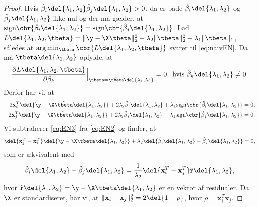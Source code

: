 %
\begin{proof}
Hvis \(\hat{\beta}_i \del{\lambda_1, \lambda_2} \hat{\beta}_j \del{\lambda_1, \lambda_2} > 0\), da er både \(\hat{\beta}_i \del{\lambda_1, \lambda_2}\) og \(\hat{\beta}_j \del{\lambda_1, \lambda_2}\) ikke-nul og der må gælder, at \(\text{sign} \cbr{\hat{\beta}_i \del{\lambda_1, \lambda_2}} = \text{sign} \cbr{\hat{\beta}_j \del{\lambda_1, \lambda_2}}\).
Lad \(L \del{\lambda_1,\lambda_2, \tbeta} = \Vert \y - \X \tbeta \Vert_2^2 + \lambda_2 \Vert \tbeta \Vert_2^2 + \lambda_1 \Vert \tbeta \Vert_1\), således at \(\arg \min_{\tbeta} \cbr{L \del{\lambda_1,\lambda_2, \tbeta}}\) svarer til \eqref{eq:naivEN}.
Da må \(\hat{\tbeta} \del{\lambda_1, \lambda_2}\) opfylde, at
\begin{align*}
\frac{\partial L \del{\lambda_1,\lambda_2, \tbeta} }{\partial \beta_k} \Bigr|_{\tbeta = \hat{\tbeta} \del{\lambda_1, \lambda_2}}=0, \text{ hvis } \hat{\beta}_k \del{\lambda_1, \lambda_2} \neq 0.
\end{align*}
Derfor har vi, at
\begin{align}
-2 \mathbf{x}_i^T \del{\y - \X \hat{\tbeta} \del{\lambda_1, \lambda_2}} +  2 \lambda_2 \hat{\beta}_i \del{\lambda_1, \lambda_2} + \lambda_1 \text{sign} \cbr{\hat{\beta}_i \del{\lambda_1, \lambda_2}} &= 0, \label{eq:EN2}\\
-2 \mathbf{x}_j^T \del{\y - \X \hat{\tbeta} \del{\lambda_1, \lambda_2}} + 2 \lambda_2 \hat{\beta}_j \del{\lambda_1, \lambda_2} + \lambda_1 \text{sign} \cbr{\hat{\beta}_j \del{\lambda_1, \lambda_2}} &= 0. \label{eq:EN3}
\end{align}
Vi subtraherer \eqref{eq:EN3} fra \eqref{eq:EN2} og finder, at
\begin{align*}
\del{\mathbf{x}_j^T-\mathbf{x}_i^T} \del{\y - \X \hat{\tbeta} \del{\lambda_1, \lambda_2}} + \lambda_2 \del{\hat{\beta}_i \del{\lambda_1, \lambda_2} - \hat{\beta}_j \del{\lambda_1, \lambda_2}} =0,
\end{align*}
som er ækvivalent med
\begin{align}
\hat{\beta}_i \del{\lambda_1, \lambda_2} - \hat{\beta}_j \del{\lambda_1, \lambda_2} = \frac{1}{\lambda_2} \del{\mathbf{x}_i^T-\mathbf{x}_j^T} \hat{\mathbf{r}}\del{\lambda_1, \lambda_2}, \label{eq:EN4}
\end{align}
hvor \(\hat{\mathbf{r}}\del{\lambda_1, \lambda_2} = \y - \X  \hat{\tbeta} \del{\lambda_1, \lambda_2}\) er en vektor af residualer.
Da \(\X\) er standardiseret, har vi, at \(\Vert \mathbf{x}_i - \mathbf{x}_j \Vert_2^2=2 \del{1-\rho}\), hvor \(\rho = \mathbf{x}_i^T \mathbf{x}_j\).

\end{proof}
